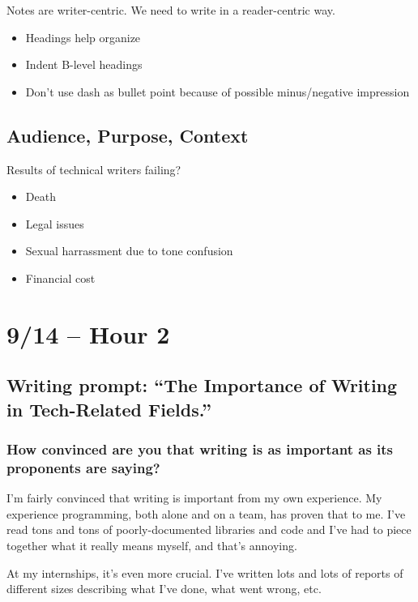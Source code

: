Notes are writer-centric. We need to write in a reader-centric way.

\begin{itemize}
    \item Headings help organize
    \item Indent B-level headings
    \item Don't use dash as bullet point because of possible minus/negative impression
\end{itemize}

\subsection{Audience, Purpose, Context}

Results of technical writers failing?

\begin{itemize}
    \item Death
    \item Legal issues 
    \item Sexual harrassment due to tone confusion
    \item Financial cost
\end{itemize}

\section{9/14 -- Hour 2}

\subsection{Writing prompt: ``The Importance of Writing in Tech-Related Fields.''}

\subsubsection{How convinced are you that writing is as important as its proponents are saying?}

I'm fairly convinced that writing is important from my own experience. My experience programming, both alone and on a team, has proven that to me. I've read tons and tons of poorly-documented libraries and code and I've had to piece together what it really means myself, and that's annoying. 

At my internships, it's even more crucial. I've written lots and lots of reports of different sizes describing what I've done, what went wrong, etc.

